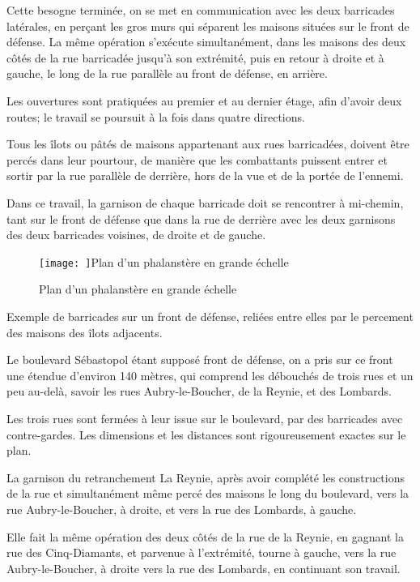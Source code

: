 \documentclass[french,twoside]{book} %
\begin{document}
Cette besogne terminée, on se met en communication avec les deux barricades latérales, en perçant les gros murs qui séparent les maisons situées sur le front de défense. La même opération s’exécute simultanément, dans les maisons des deux côtés de la rue barricadée jusqu’à son extrémité, puis en retour à droite et à gauche, le long de la rue parallèle au front de défense, en arrière.\par
Les ouvertures sont pratiquées au premier et au dernier étage, afin d’avoir deux routes; le travail se poursuit à la fois dans quatre directions.\par
Tous les îlots ou pâtés de maisons appartenant aux rues barricadées, doivent être percés dans leur pourtour, de manière que les combattants puissent entrer et sortir par la rue parallèle de derrière, hors de la vue et de la portée de l’ennemi.\par
Dans ce travail, la garnison de chaque barricade doit se rencontrer à mi-chemin, tant sur le front de défense que dans la rue de derrière avec les deux garnisons des deux barricades voisines, de droite et de gauche.\par
\begin{figure}[htbp]
\noindent\noindent\texttt{[image: ]}Plan d’un phalanstère en grande échelle
\caption{Plan d’un phalanstère en grande échelle}\end{figure}
\noindent Exemple de barricades sur un front de défense, reliées entre elles par le percement des maisons des îlots adjacents.\par
Le boulevard Sébastopol étant supposé front de défense, on a pris sur ce front une étendue d’environ 140 mètres, qui comprend les débouchés de trois rues et un peu au-delà, savoir les rues Aubry-le-Boucher, de la Reynie, et des Lombards.\par
Les trois rues sont fermées à leur issue sur le boulevard, par des barricades avec contre-gardes. Les dimensions et les distances sont rigoureusement exactes sur le plan.\par
La garnison du retranchement La Reynie, après avoir complété les constructions de la rue et simultanément même percé des maisons le long du boulevard, vers la rue Aubry-le-Boucher, à droite, et vers la rue des Lombards, à gauche.\par
Elle fait la même opération des deux côtés de la rue de la Reynie, en gagnant la rue des Cinq-Diamants, et parvenue à l’extrémité, tourne à gauche, vers la rue Aubry-le-Boucher, à droite vers la rue des Lombards, en continuant son travail.\par
\end{document}
